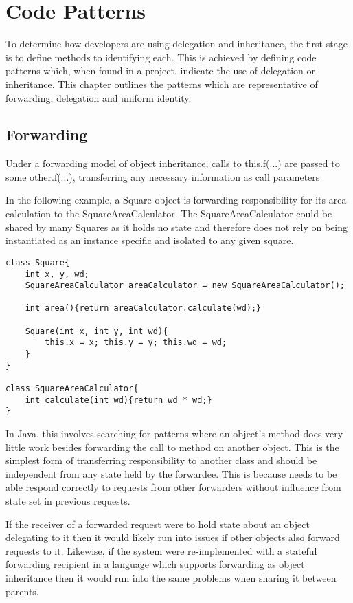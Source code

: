 \chapter{Code Patterns}\label{C:bg}
To determine how developers are using delegation and inheritance, the first stage is to define methods to identifying each. This is achieved by defining code patterns which, when found in a project, indicate the use of delegation or inheritance. This chapter outlines the patterns which are representative of forwarding, delegation and uniform identity.

\section{Forwarding}
Under a forwarding model of object inheritance, calls to this.f(...) are passed to some other.f(...), transferring any necessary information as call parameters
\newline

In the following example, a Square object is forwarding responsibility for its area calculation to the SquareAreaCalculator. The SquareAreaCalculator could be shared by many Squares as it holds no state and therefore does not rely on being instantiated as an instance specific and isolated to any given square.

\begin{lstlisting}
class Square{
	int x, y, wd;
	SquareAreaCalculator areaCalculator = new SquareAreaCalculator();

	int area(){return areaCalculator.calculate(wd);}

	Square(int x, int y, int wd){
		this.x = x; this.y = y; this.wd = wd;
	}
}

class SquareAreaCalculator{
	int calculate(int wd){return wd * wd;}
}
\end{lstlisting}

In Java, this involves searching for patterns where an object's method does very little work besides forwarding the call to method on another object. This is the simplest form of transferring responsibility to another class and should be independent from any state held by the forwardee. This is because needs to be able respond correctly to requests from other forwarders without influence from state set in previous requests.

If the receiver of a forwarded request were to hold state about an object delegating to it then it would likely run into issues if other objects also forward requests to it. Likewise, if the system were re-implemented with a stateful forwarding recipient in a language which supports forwarding as object inheritance then it would run into the same problems when sharing it between parents.

